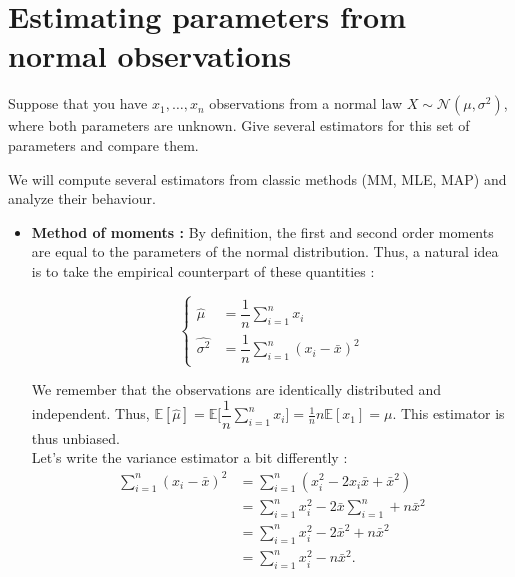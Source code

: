 \section{Estimating parameters from normal observations}

\begin{tcolorbox}[width=\linewidth, sharp corners=all, colback=white!95!black]
Suppose that you have $x_1,\dots,x_n$ observations from a normal law $X \sim \mathcal{N}(\mu, \sigma^2)$, where both parameters are unknown. Give several estimators for this set of parameters and compare them.
\end{tcolorbox}

We will compute several estimators from classic methods (MM, MLE, MAP) and analyze their behaviour.

\begin{itemize}
    \item \textbf{Method of moments : }\newline
    By definition, the first and second order moments are equal to the parameters of the normal distribution. Thus, a natural idea is to take the empirical counterpart of these quantities :
    
    $$\left\{\begin{array}{ll}
        \hat{\mu} &= \dfrac{1}{n}\sum\limits_{i=1}^n x_i\\
        \widehat{\sigma^2} &= \dfrac{1}{n}\sum\limits_{i=1}^n (x_i - \bar{x})^2
    \end{array}\right.$$
    
    We remember that the observations are identically distributed and independent. Thus, $\mathbb{E}[\hat{\mu}] = \mathbb{E}\Big[\dfrac{1}{n}\sum\limits_{i=1}^n x_i\Big] = \frac1{n} n \mathbb{E}[x_1] = \mu.$ This estimator is thus unbiased.\\
    
    Let's write the variance estimator a bit differently :
    \begin{align*}
    \sum\limits_{i=1}^n (x_i - \bar{x})^2 &= \displaystyle \sum\limits_{i=1}^n (x_i^2 -  2x_i\bar{x} + \bar{x}^2) \\
    &= \displaystyle \sum\limits_{i=1}^n x_i^2 -  2\bar{x}\displaystyle \sum\limits_{i=1}^n + n\bar{x}^2 \\
    &= \displaystyle \sum\limits_{i=1}^n x_i^2 -  2\bar{x}^2 + n\bar{x}^2 \\
    &= \displaystyle \sum\limits_{i=1}^n x_i^2 -  n\bar{x}^2.
    \end{align*}


\end{itemize}
